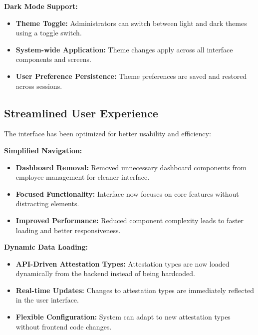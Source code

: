 \documentclass[a4paper,12pt]{report}
\begin{document}
\begin{doublespace}
\textbf{Dark Mode Support:}
\begin{itemize}
    \item \textbf{Theme Toggle:} Administrators can switch between light and dark themes using a toggle switch.
    \item \textbf{System-wide Application:} Theme changes apply across all interface components and screens.
    \item \textbf{User Preference Persistence:} Theme preferences are saved and restored across sessions.
\end{itemize}

\subsection{Streamlined User Experience}
\hspace{1cm}The interface has been optimized for better usability and efficiency:

\textbf{Simplified Navigation:}
\begin{itemize}
    \item \textbf{Dashboard Removal:} Removed unnecessary dashboard components from employee management for cleaner interface.
    \item \textbf{Focused Functionality:} Interface now focuses on core features without distracting elements.
    \item \textbf{Improved Performance:} Reduced component complexity leads to faster loading and better responsiveness.
\end{itemize}

\textbf{Dynamic Data Loading:}
\begin{itemize}
    \item \textbf{API-Driven Attestation Types:} Attestation types are now loaded dynamically from the backend instead of being hardcoded.
    \item \textbf{Real-time Updates:} Changes to attestation types are immediately reflected in the user interface.
    \item \textbf{Flexible Configuration:} System can adapt to new attestation types without frontend code changes.
\end{itemize}

\end{doublespace}
\end{document}
